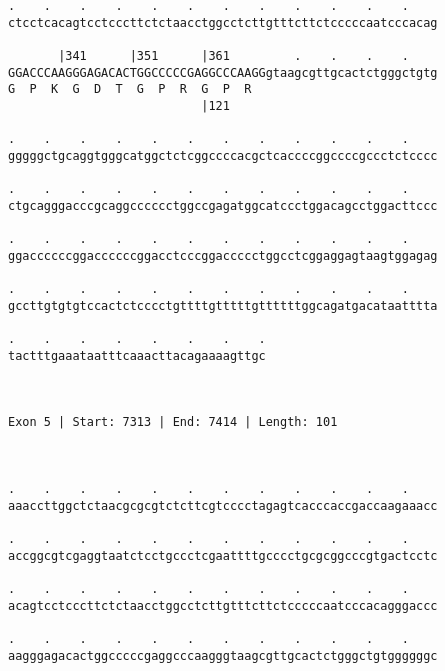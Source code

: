 \documentclass{article}
\begin{document}
\begin{Verbatim}
.    .    .    .    .    .    .    .    .    .    .    .    
ctcctcacagtcctcccttctctaacctggcctcttgtttcttctcccccaatcccacag
                                                            
       |341      |351      |361         .    .    .    .    
GGACCCAAGGGAGACACTGGCCCCCGAGGCCCAAGGgtaagcgttgcactctgggctgtg
G  P  K  G  D  T  G  P  R  G  P  R                          
                           |121                             
  
.    .    .    .    .    .    .    .    .    .    .    .    
gggggctgcaggtgggcatggctctcggccccacgctcaccccggccccgccctctcccc
                                                            
.    .    .    .    .    .    .    .    .    .    .    .    
ctgcagggacccgcaggcccccctggccgagatggcatccctggacagcctggacttccc
                                                            
.    .    .    .    .    .    .    .    .    .    .    .    
ggaccccccggaccccccggacctcccggaccccctggcctcggaggagtaagtggagag
                                                            
.    .    .    .    .    .    .    .    .    .    .    .    
gccttgtgtgtccactctcccctgttttgtttttgttttttggcagatgacataatttta
                                                            
.    .    .    .    .    .    .    .
tactttgaaataatttcaaacttacagaaaagttgc
                                    
                                    
 
Exon 5 | Start: 7313 | End: 7414 | Length: 101



.    .    .    .    .    .    .    .    .    .    .    .    
aaaccttggctctaacgcgcgtctcttcgtcccctagagtcacccaccgaccaagaaacc
                                                            
.    .    .    .    .    .    .    .    .    .    .    .    
accggcgtcgaggtaatctcctgccctcgaattttgcccctgcgcggcccgtgactcctc
                                                            
.    .    .    .    .    .    .    .    .    .    .    .    
acagtcctcccttctctaacctggcctcttgtttcttctcccccaatcccacagggaccc
                                                            
.    .    .    .    .    .    .    .    .    .    .    .    
aagggagacactggcccccgaggcccaagggtaagcgttgcactctgggctgtggggggc
                                                            

\end{Verbatim}
\end{document}
